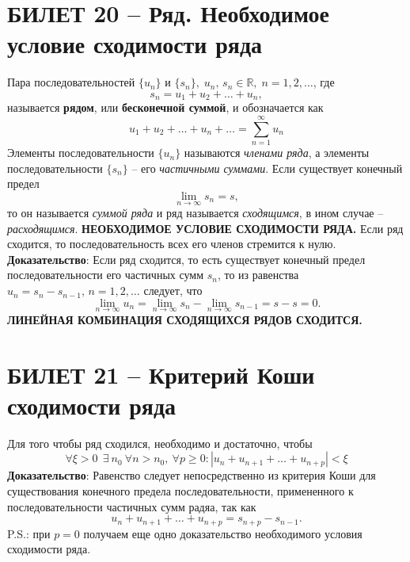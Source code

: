 \documentclass{article}
\newcommand{\R}{\mathbb R}
\begin{document}
\section{БИЛЕТ 20 -- Ряд. Необходимое условие сходимости ряда}
Пара последовательностей $\{u_{n}\}$ и $\{s_{n}\},\;u_{n},\,s_{n}\in\R,\;n=1,2,\ldots$, где $$ s_{n}=u_{1}+u_{2}+\ldots+u_{n}, $$
называется \textbf{рядом}, или \textbf{бесконечной суммой}, и обозначается как
$$ u_{1}+u_{2}+\ldots+u_{n}+\ldots=\sum_{n=1}^{\infty}u_{n} $$
Элементы последовательности $\{u_{n}\}$ называются \textit{членами ряда}, а элементы последовательности $\{s_{n}\}$ -- его \textit{частичными суммами}.
\newline
Если существует конечный предел 
$$ \lim_{n\to\infty}s_{n}=s, $$
то он называется \textit{суммой ряда} и ряд называется \textit{сходящимся}, в ином случае -- \textit{расходящимся}.
\newline
\newline
\textbf{НЕОБХОДИМОЕ УСЛОВИЕ СХОДИМОСТИ РЯДА.}
Если ряд сходится, то последовательность всех его членов стремится к нулю.
\newline
\newline
\textbf{Доказательство}:
\newline
\newline
Если ряд сходится, то есть существует конечный предел последовательности его частичных сумм $s_{n}$, то из равенства $u_{n}=s_{n}-s_{n-1},\,n=1,2,\ldots$ следует, что
$$ \lim_{n\to\infty}u_{n}=\lim_{n\to\infty}s_{n}-\lim_{n\to\infty}s_{n-1}=s-s=0. $$
\textbf{ЛИНЕЙНАЯ КОМБИНАЦИЯ СХОДЯЩИХСЯ РЯДОВ СХОДИТСЯ.}

\newpage
\section{БИЛЕТ 21 -- Критерий Коши сходимости ряда}
Для того чтобы ряд сходился, необходимо и достаточно, чтобы
$$ \forall\xi>0\:\:\exists\:n_{0}\:\forall n>n_{0},\:\forall p\geqslant0:|u_{n}+u_{n+1}+\ldots+u_{n+p}|<\xi $$
\textbf{Доказательство}:
\newline
\newline
Равенство следует непосредственно из критерия Коши для существования конечного предела последовательности, примененного к последовательности частичных сумм радяа, так как
$$ u_{n}+u_{n+1}+\ldots+u_{n+p}=s_{n+p}-s_{n-1}. $$
P.S.: при $p=0$ получаем еще одно доказательство необходимого условия сходимости ряда.
\newpage
\end{document}
